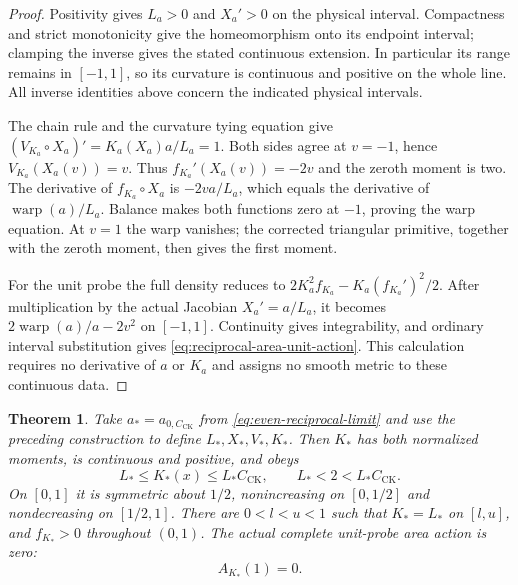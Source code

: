 \documentclass[11pt]{article}
\newtheorem{theorem}{Theorem}[section]
\begin{document}
\begin{proof}
Positivity gives $L_a>0$ and $X_a'>0$ on the physical interval. Compactness
and strict monotonicity give the homeomorphism onto its endpoint interval;
clamping the inverse gives the stated continuous extension. In particular its
range remains in $[-1,1]$, so its curvature is continuous and positive on the
whole line. All inverse identities above concern the indicated physical
intervals.

The chain rule and the curvature tying equation give
$(V_{K_a}\circ X_a)'=K_a(X_a)a/L_a=1$.
Both sides agree at $v=-1$, hence $V_{K_a}(X_a(v))=v$.
Thus $f_{K_a}'(X_a(v))=-2v$ and the zeroth moment is two.
The derivative of $f_{K_a}\circ X_a$ is $-2va/L_a$, which equals the
derivative of $\operatorname{warp}(a)/L_a$.
Balance makes both functions zero at $-1$, proving the warp equation.
At $v=1$ the warp vanishes; the corrected triangular primitive, together with
the zeroth moment, then gives the first moment.

For the unit probe the full density reduces to
$2K_a^2f_{K_a}-K_a(f_{K_a}')^2/2$.
After multiplication by the actual Jacobian $X_a'=a/L_a$, it becomes
$2\operatorname{warp}(a)/a-2v^2$ on $[-1,1]$.
Continuity gives integrability, and ordinary interval substitution gives
\eqref{eq:reciprocal-area-unit-action}. This calculation requires no derivative
of $a$ or $K_a$ and assigns no smooth metric to these continuous data.
\end{proof}

\begin{theorem}\label{thm:critical-area-curvature}
Take $a_*=a_{0,C_{\mathrm{CK}}}$ from \eqref{eq:even-reciprocal-limit} and use the
preceding construction to define $L_*,X_*,V_*,K_*$.
Then $K_*$ has both normalized moments, is continuous and positive, and obeys
\[
 L_*\le K_*(x)\le L_*C_{\mathrm{CK}},\qquad
 L_*<2<L_*C_{\mathrm{CK}}.
\]
On $[0,1]$ it is symmetric about $1/2$, nonincreasing on $[0,1/2]$ and
nondecreasing on $[1/2,1]$.
There are $0<l<u<1$ such that $K_*=L_*$ on $[l,u]$,
and $f_{K_*}>0$ throughout $(0,1)$.
The actual complete unit-probe area action is zero:
\begin{equation}\label{eq:critical-area-zero-action}
 A_{K_*}(1)=0.
\end{equation}
\end{theorem}
\end{document}
